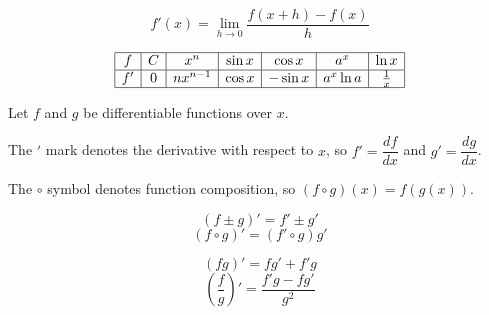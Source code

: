 \documentclass[../main.tex]{subfile}
\begin{document}


\begin{center}
\vspace{-2.8em}\large
$$f'(x) = \lim_{h \to 0} \frac{f(x + h) - f(x)}{h}$$
\normalsize
\end{center}

{\large\renewcommand{\arraystretch}{1.5}
$$\begin{array}{|*{7}{c|}}
	\hline
	f & C & x^n & \sin x & \cos x & a^x & \ln x \\
	\hline
	f' & 0 & nx^{n-1} & \cos x & -\sin x & a^x\ln a & \frac{1}{x} \\
	\hline
\end{array}$$
}


\vspace{-0.8em}
\begin{center}
Let $f$ and $g$ be differentiable functions over $x$.

The $'$ mark denotes the derivative with respect to $x$, so $f' = \dfrac{df}{dx}$ and $g' = \dfrac{dg}{dx}$.

The $\circ$ symbol denotes function composition, so $(f \circ g)(x) = f(g(x))$.
\end{center}
\vspace{0.5em}

\begin{figure}[h]
{\centering\large
\begin{minipage}{0.49\linewidth}
	$$(f \pm g)' = f' \pm g'$$
	\vspace{0.5em}
	$$(f \circ g)' = (f' \circ g) g'$$
\end{minipage}\hfill
\begin{minipage}{0.49\linewidth}
	$$(fg)' = fg' + f'g$$
	\vspace{0.5em}
	$$\left(\frac{f}{g}\right)' = \frac{f'g - fg'}{g^2}$$
\end{minipage}
}
\end{figure}
\end{document}
